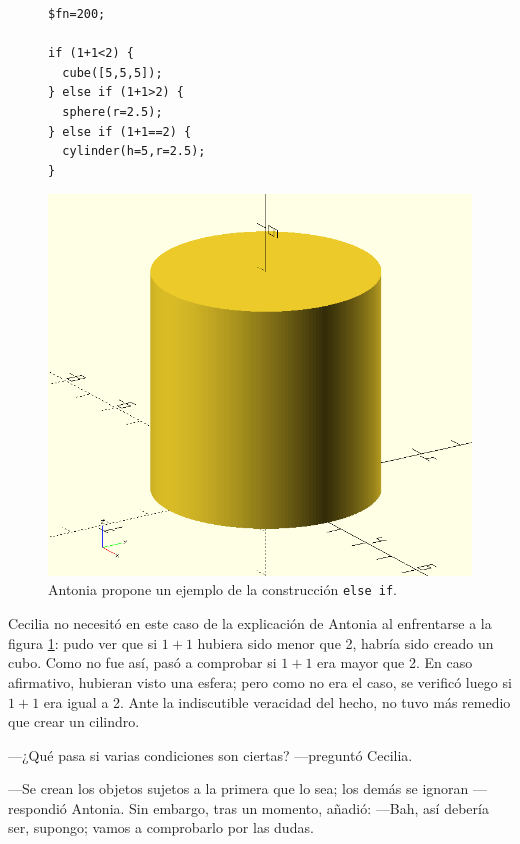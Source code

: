   \begin{figure}[ht]
\begin{minipage}[]{.5\textwidth}%
\begin{lstlisting}
$fn=200;

if (1+1<2) {
  cube([5,5,5]);
} else if (1+1>2) {
  sphere(r=2.5);
} else if (1+1==2) {
  cylinder(h=5,r=2.5);
}
\end{lstlisting}%

\end{minipage}
\begin{minipage}[]{.49\textwidth}%

  \centering
  \includegraphics[width=.7\textwidth]{imagenes/if-3}
  \end{minipage}
  \caption{Antonia propone un ejemplo de la construcción
    \lstinline!else if!.}
  \label{fig:if-3}
\end{figure}

Cecilia no necesitó en este caso de la explicación de Antonia al
enfrentarse a la figura \ref{fig:if-3}: pudo ver que si $1+1$ hubiera
sido menor que 2, habría sido creado un cubo. Como no fue así,
\openscad{} pasó a comprobar si $1+1$ era mayor que 2. En caso
afirmativo, hubieran visto una esfera; pero como no era el caso, se
verificó luego si $1+1$ era igual a 2. Ante la indiscutible veracidad
del hecho, \openscad{} no tuvo más remedio que crear un cilindro.

---¿Qué pasa si varias condiciones son ciertas? ---preguntó Cecilia.

---Se crean los objetos sujetos a la primera que lo sea; los demás se
ignoran ---res\-pon\-dió Antonia. Sin embargo, tras un momento, añadió:
---Bah, así debería ser, supongo; vamos a comprobarlo por las dudas.

